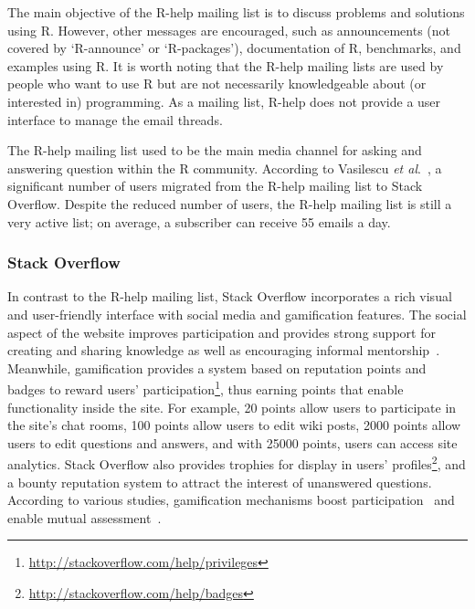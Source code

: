 \documentclass{sig-alternate-05-2015}
\begin{document}
	The main objective of the R-help mailing list is to discuss problems and solutions using R. 
	However, other messages are encouraged, such as announcements (not covered by `R-announce' or `R-packages'), documentation of R, benchmarks, and examples using R. 
	It is worth noting that the R-help mailing lists are used by people who want to use R but are not necessarily knowledgeable about (or interested in) programming. 
	As a mailing list, R-help does not provide a user interface to manage the email threads.

	The R-help mailing list used to be the main media channel for asking and answering question within the R community.
	According to Vasilescu \textit{et al}.~\cite{Vasilescu2014c}, a significant number of users migrated from the R-help mailing list to Stack Overflow. 
	Despite the reduced number of users, the R-help mailing list is still a very active list; 
	on average, a subscriber can receive 55 emails a day.

\subsubsection{Stack Overflow}
\label{subsec:Rtag}

	In contrast to the R-help mailing list, Stack Overflow incorporates a rich visual and user-friendly interface with social media and gamification features.
	The social aspect of the website improves participation and provides strong support for creating and sharing knowledge as well as encouraging informal mentorship~\cite{Jenkins2009, Storey2014}.
	Meanwhile, gamification provides a system based on reputation points and badges to reward users' participation\footnote{\url{http://stackoverflow.com/help/privileges}}, thus earning points that enable functionality inside the site.
	For example, 20 points allow users to participate in the site's chat rooms, 100 points allow users to edit wiki posts, 2000 points allow users to edit questions and answers, and with 25000 points, users can access site analytics.
	Stack Overflow also provides trophies for display in users' profiles\footnote{\url{http://stackoverflow.com/help/badges}}, and a bounty reputation system to attract the interest of unanswered questions.
	According to various studies, gamification mechanisms boost participation~\cite{Vasilescu2014} and enable mutual assessment~\cite{Singer2013}.
\end{document}
